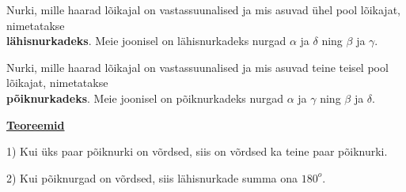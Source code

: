 \begin{center}
{{{\begin{flushleft}
\hspace{5mm}
Nurki, mille haarad lõikajal on vastassuunalised ja mis asuvad ühel pool lõikajat, nimetatakse\\ \hspace{5mm} \textbf{lähisnurkadeks}. Meie joonisel on lähisnurkadeks nurgad $\alpha$ ja $\delta$ ning $\beta$ ja $\gamma$.

\vspace{2mm}
\hspace{5mm}
Nurki, mille haarad lõikajal on vastassuunalised ja mis asuvad teine teisel pool lõikajat, nimetatakse\\ \hspace{5mm} \textbf{põiknurkadeks}. Meie joonisel on põiknurkadeks nurgad $\alpha$ ja $\gamma$ ning $\beta$ ja $\delta$.

\vspace{5mm}
\hspace{5mm}
\textbf{\underline{Teoreemid}}

\vspace{2mm}
\hspace{5mm}
1) Kui üks paar põiknurki on võrdsed, siis on võrdsed ka teine paar põiknurki.


\begin{center}
\end{center}



\vspace{2mm}
\hspace{5mm}
2) Kui põiknurgad on võrdsed, siis lähisnurkade summa ona  $180^{o}$.

\end{flushleft}
}}}
\end{center}

